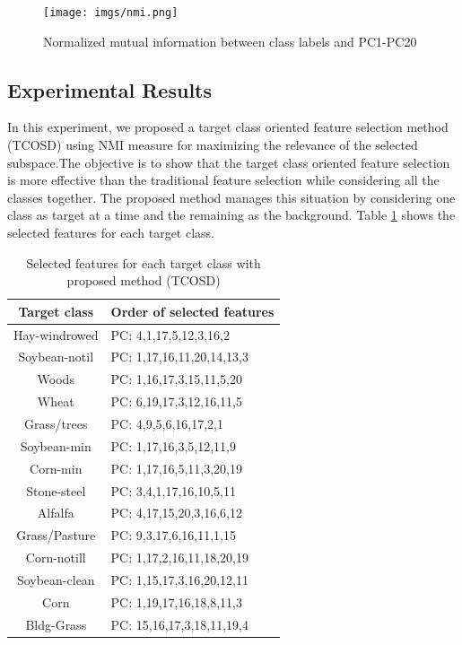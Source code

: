\documentclass[document.tex]{subfiles}
\begin{document}
\begin{figure}[H]
	\begin{center}
		\texttt{[image: imgs/nmi.png]}
	\end{center}
	\caption{Normalized mutual information between class labels and PC1-PC20}
	\label{fig:Normalized mutual information between class labels and PC1-PC20}
\end{figure}

\subsection{Experimental Results}
In this experiment, we proposed a target class oriented feature selection method (TCOSD) using NMI measure for maximizing the relevance of the selected subspace.The objective is to show that the target class oriented feature selection is more effective than the traditional feature selection while considering all the classes together. The proposed method manages this situation by considering one class as target at a time and the remaining as the background. Table \ref{tab:Selected features for each target class with proposed method (TCOSD)} shows the selected features for each target class. 
\begin{table}[H]
	\caption{Selected features for each target class with proposed method (TCOSD)}
	\begin{center}
		\begin{tabular}{|c|l|}
			\hline
			Target class & Order of selected features\\ \hline
			Hay-windrowed & PC: 4,1,17,5,12,3,16,2\\ \hline
			Soybean-notil & PC: 1,17,16,11,20,14,13,3\\ \hline
			Woods & PC: 1,16,17,3,15,11,5,20\\ \hline
			Wheat & PC: 6,19,17,3,12,16,11,5\\ \hline
			Grass/trees & PC: 4,9,5,6,16,17,2,1\\ \hline
			Soybean-min & PC: 1,17,16,3,5,12,11,9\\ \hline
			Corn-min & PC: 1,17,16,5,11,3,20,19\\ \hline
			Stone-steel & PC: 3,4,1,17,16,10,5,11\\ \hline
			Alfalfa & PC: 4,17,15,20,3,16,6,12\\ \hline
			Grass/Pasture & PC: 9,3,17,6,16,11,1,15\\ \hline
			Corn-notill & PC: 1,17,2,16,11,18,20,19\\ \hline
			Soybean-clean & PC: 1,15,17,3,16,20,12,11\\ \hline
			Corn & PC: 1,19,17,16,18,8,11,3\\ \hline
			Bldg-Grass & PC: 15,16,17,3,18,11,19,4\\ \hline
		\end{tabular}
	\end{center}
	\label{tab:Selected features for each target class with proposed method (TCOSD)}
\end{table}
\end{document}
